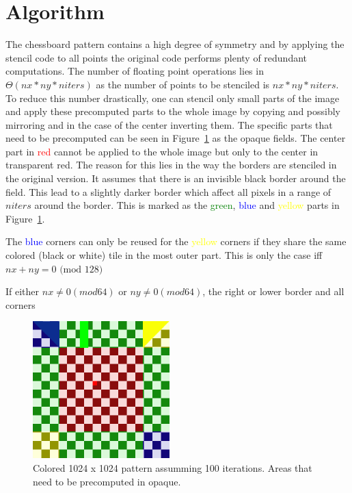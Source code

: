 \documentclass[letterpaper,twocolumn,10pt]{article}
\begin{document}
\section*{Algorithm}
The chessboard pattern contains a high degree of symmetry and by applying the stencil code
to all points the original code performs plenty of redundant computations.
The number of floating point operations lies in $\Theta(nx * ny * niters)$
as the number of points to be stenciled is $nx * ny *niters$.
To reduce this number drastically, one can stencil only small parts of the image and apply
these precomputed parts to the whole image by copying and possibly mirroring and in the case
of the center inverting them. The specific parts that need to be precomputed can be seen
in Figure~\ref{fig:board} as the opaque fields. The center part in \textcolor{red}{red} cannot be applied to the whole image but only to the center in transparent red.
The reason for this lies in the way the borders are stenciled in the original version. It assumes that there is an invisible black border around the field. This lead to a slightly darker border which affect all pixels in a range of $niters$ around the border. This is marked as the \textcolor{green}{green}, \textcolor{blue}{blue} and \textcolor{yellow}{yellow} parts in Figure~\ref{fig:board}.

The \textcolor{blue}{blue} corners can only be reused for the \textcolor{yellow}{yellow} corners if they share the same colored (black or white) tile in the most outer part. This is only the case iff $nx + ny = 0 \text{ (mod } 128\text{)}$

If either $nx \neq 0 (mod 64)$ or $ny \neq 0 (mod 64)$, the right or lower border and all
corners
\begin{figure}[ht]
	\begin{center}
	\includegraphics[width=150pt]{res/stencil_colored_with_prec}
	\caption{Colored 1024 x 1024 pattern assumming 100 iterations. Areas that need to be precomputed in opaque.}
	\end{center}
	\label{fig:board}
\end{figure}
\end{document}
